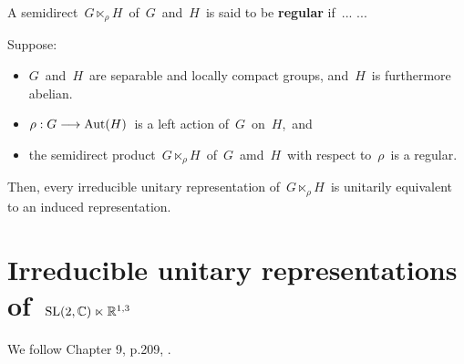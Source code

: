 

\vskip 0.5cm
\begin{definition}
\mbox{}
\vskip 0.1cm
\noindent
A semidirect
\,$G \ltimes_{\rho}\! H$\, of \,$G$\, and \,$H$\,
is said to be \textbf{regular} if \,... ...
\end{definition}


\vskip 0.5cm
\begin{theorem}
\mbox{}
\vskip 0.1cm
\noindent
Suppose:
\begin{itemize}
\item
	$G$\, and \,$H$\, are separable and locally compact groups, and
	\,$H$\, is furthermore abelian.
\item
	$\rho : G \longrightarrow \textnormal{Aut}(H)$\,
	is a left action of \,$G$\, on \,$H$,\, and
\item
	the semidirect product
	\,$G \ltimes_{\rho}\! H$\, of \,$G$\, amd \,$H$\,
	with respect to \,$\rho$\,
	is a regular.
\end{itemize}
Then, every irreducible unitary representation of
\,$G \ltimes_{\rho}\! H$\,
is unitarily equivalent to an induced representation.
\end{theorem}


\vskip 1.0cm
\section{Irreducible unitary representations of \,$\textnormal{SL}(2,\mathbb{C}) \ltimes \mathbb{R}^{1,3}$}


We follow Chapter 9, p.209, \cite{Talagrand2022}.

